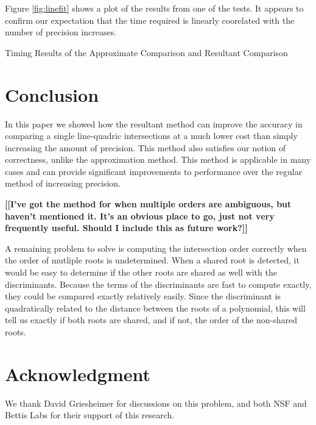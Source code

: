\documentclass{cccg16}
\def\Michael#1{{\bf \color{red} [[#1]]}\ignorespaces}
\begin{document}
Figure \ref{fig:linefit} shows a plot of the results from one of the
tests.  It appears to confirm our expectation that the time required
is linearly coorelated with the number of precision increases.

\begin{table}[p]
  \caption{Timing Results of the Approximate Comparison and Resultant Comparison}
  \label{tab:times}
  
\end{table}

\section{Conclusion}
In this paper we showed how the resultant method can improve the
accuracy in comparing a single line-quadric intersections at a much
lower cost than simply increasing the amount of precision.  This
method also satisfies our notion of correctness, unlike the
approximation method.  This method is applicable in many cases and can
provide significant improvements to performance over the regular
method of increasing precision.

\Michael{I've got the method for when multiple orders are ambiguous,
  but haven't mentioned it.  It's an obvious place to go, just not
  very frequently useful.  Should I include this as future work?}

A remaining problem to solve is computing the intersection order
correctly when the order of mutliple roots is undetermined.  When a
shared root is detected, it would be easy to determine if the other
roots are shared as well with the discriminants.  Because the terms of
the discriminants are fast to compute exactly, they could be compared
exactly relatively easily.  Since the discriminant is quadratically
related to the distance between the roots of a polynomial, this will
tell us exactly if both roots are shared, and if not, the order of the
non-shared roots.

\section{Acknowledgment}
We thank David Griesheimer for discussions on this problem, and both NSF and Bettis Labs for their support of this research. 



\end{document}
